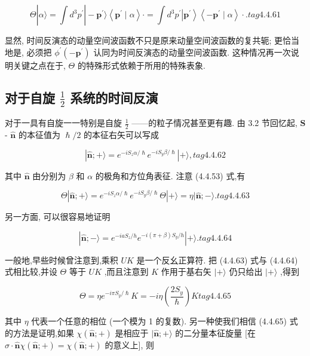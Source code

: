 $$
\Theta \left| {\alpha \rangle = \int {d}^{3}{p}^{\prime }}\right| - {\mathbf{p}}^{\prime }\rangle \left\langle {{\mathbf{p}}^{\prime } \mid \alpha }\right\rangle \cdot = \int {d}^{3}{p}^{\prime }\left| {\mathbf{p}}^{\prime }\right\rangle \left\langle {-{\mathbf{p}}^{\prime } \mid \alpha }\right\rangle \cdot . tag{4. 4.61}
$$

显然, 时间反演态的动量空间波函数不只是原来动量空间波函数的复共轭; 更恰当地是, 必须把 ${\phi }^{\prime }\left( {-{\mathbf{p}}^{\prime }}\right)$ 认同为时间反演态的动量空间波函数. 这种情况再一次说明关键之点在于, $\Theta$ 的特殊形式依赖于所用的特殊表象.

\subsection{对于自旋 $\frac{1}{2}$ 系统的时间反演}

对于一具有自旋一一特别是自旋 $\frac{1}{2}$ ——的粒子情况甚至更有趣. 由 3.2 节回忆起, $\mathbf{S}$ - $\widehat{\mathbf{n}}$ 的本征值为 $\hslash /2$ 的本征右矢可以写成

$$
\left| {\widehat{\mathbf{n}}; + \rangle = {e}^{-i{S}_{z}\alpha /\hslash }{e}^{-i{S}_{y}\beta /\hslash }}\right| + \rangle , tag{4. 4.62}
$$

其中 $\widehat{\mathbf{n}}$ 由分别为 $\beta$ 和 $\alpha$ 的极角和方位角表征. 注意 (4.4.53) 式,有

$$
\Theta \left| {\widehat{\mathbf{n}}; + \rangle = {e}^{-i{S}_{z}\alpha /\hslash }{e}^{-i{S}_{y}\beta /\hslash }\Theta }\right| + \rangle = \eta |\widehat{\mathbf{n}}; - \rangle . tag{4. 4.63}
$$

另一方面, 可以很容易地证明

$$
\left| {\widehat{\mathbf{n}}; - \rangle = {e}^{-{ia}{S}_{z}/h}{e}^{-i\left( {\pi + \beta }\right) {S}_{y}/h}}\right| + \rangle . tag{4. 4.64}
$$

一般地,早些时候曾注意到,乘积 ${UK}$ 是一个反幺正算符. 把 (4.4.63) 式与 (4.4.64) 式相比较,并设 $\Theta$ 等于 ${UK}$ ,而且注意到 $K$ 作用于基右矢 $| + \rangle$ 仍只给出 $| + \rangle$ ,得到

$$
\Theta = \eta {e}^{-{i\pi }{S}_{y}/\hslash }K = - {i\eta }\left( \frac{2{S}_{y}}{\hslash }\right) K tag{4. 4.65}
$$

其中 $\eta$ 代表一个任意的相位 (一个模为 1 的复数). 另一种使我们相信 (4.4.65) 式的方法是证明,如果 $\chi \left( {\widehat{\mathbf{n}}; + }\right)$ 是相应于 $|\widehat{\mathbf{n}}; + \rangle$ 的二分量本征旋量 [在 $\sigma \cdot \widehat{\mathbf{n}}\chi \left( {\widehat{\mathbf{n}}; + }\right) = \chi \left( {\widehat{\mathbf{n}}; + }\right)$ 的意义上], 则

